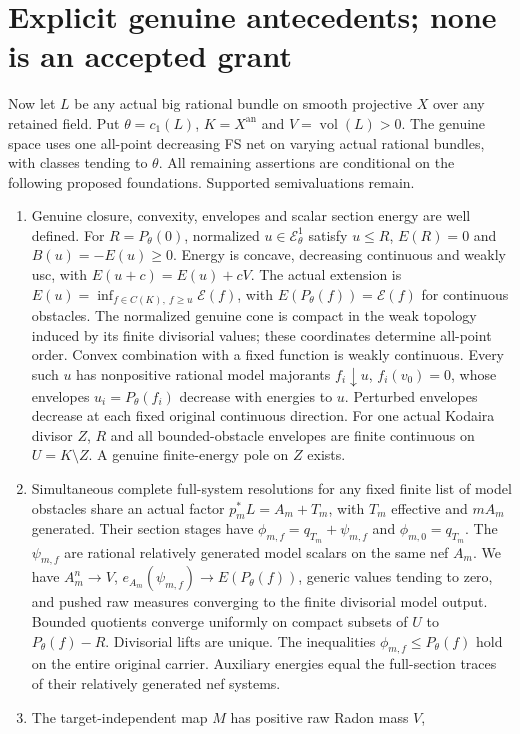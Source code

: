 \documentclass[11pt]{article}
\newcommand{\EE}{\mathcal E^1_\theta}
\begin{document}
\section{Explicit genuine antecedents; none is an accepted grant}
Now let $L$ be any actual big rational bundle on smooth projective $X$
over any retained field. Put $\theta=c_1(L)$, $K=X^{\mathrm{an}}$ and
$V=\operatorname{vol}(L)>0$. The genuine space uses one all-point
decreasing FS net on varying actual rational bundles, with classes
tending to $\theta$. All remaining assertions are conditional on
the following proposed foundations. Supported semivaluations remain.
\begin{enumerate}
\item Genuine closure, convexity, envelopes and scalar section energy
are well defined. For $R=P_\theta(0)$, normalized $u\in\EE$ satisfy
$u\leq R$, $E(R)=0$ and $B(u)=-E(u)\geq0$. Energy is concave,
decreasing continuous and weakly usc, with $E(u+c)=E(u)+cV$.
The actual extension is $E(u)=\inf_{f\in C(K),\ f\geq u}\mathscr E(f)$,
with $E(P_\theta(f))=\mathscr E(f)$ for continuous obstacles.
The normalized genuine cone is compact in the weak topology induced
by its finite divisorial values; these coordinates determine all-point
order. Convex combination with a fixed function is weakly continuous.
Every such $u$ has nonpositive rational model majorants
$f_i\downarrow u$, $f_i(v_0)=0$, whose envelopes $u_i=P_\theta(f_i)$
decrease with energies to $u$. Perturbed envelopes decrease at each
fixed original continuous direction. For one actual Kodaira divisor
$Z$, $R$ and all bounded-obstacle envelopes are finite continuous on
$U=K\setminus Z$. A genuine finite-energy pole on $Z$ exists.
\item Simultaneous complete full-system resolutions for any fixed
finite list of model obstacles share an actual factor
$p_m^*L=A_m+T_m$, with $T_m$ effective and $mA_m$ generated.
Their section stages have $\phi_{m,f}=q_{T_m}+\psi_{m,f}$ and
$\phi_{m,0}=q_{T_m}$. The $\psi_{m,f}$ are rational relatively
generated model scalars on the same nef $A_m$. We have $A_m^n\to V$,
$e_{A_m}(\psi_{m,f})\to E(P_\theta(f))$, generic values tending to
zero, and pushed raw measures converging to the finite divisorial model
output. Bounded quotients converge uniformly on compact subsets of $U$
to $P_\theta(f)-R$. Divisorial lifts are unique. The inequalities
$\phi_{m,f}\leq P_\theta(f)$ hold on the entire original carrier.
Auxiliary energies equal the full-section traces of their relatively
generated nef systems.
\item The target-independent map $M$ has positive raw Radon mass $V$,

\end{enumerate}
\end{document}
